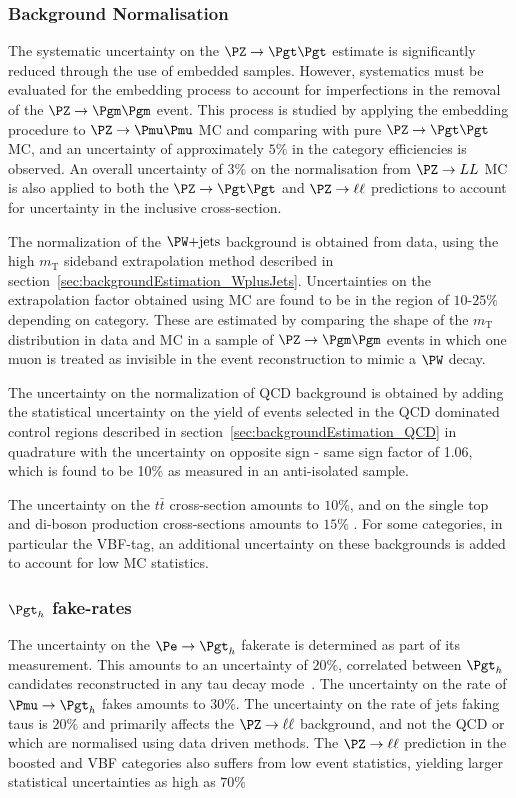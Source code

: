 \subsubsection{\textbf{Background Normalisation}}
The systematic uncertainty on the $\ZToTauTau$ estimate is significantly reduced
through the use of embedded samples. However, systematics must be evaluated for
the embedding process to account for imperfections in the removal of the
$\PZ\to\Pgm\Pgm$ event. This process is studied by applying the embedding
procedure to $\PZ\to\Pmu\Pmu$ \ac{MC} and comparing with pure $\ZToTauTau$
\ac{MC}, and an uncertainty of approximately $5\%$ in the category efficiencies
is observed. An overall uncertainty of $3\%$ on the normalisation from
$\PZ\to LL$ \ac{MC} is also applied to both the $\ZToTauTau$ and
$\PZ\to\ell\ell$ predictions to account for uncertainty in the inclusive
cross-section.

The normalization of the $\WJets$ background is obtained from data, 
using the high $m_{\text{T}}$ sideband extrapolation method described in
section~\ref{sec:backgroundEstimation_WplusJets}. Uncertainties on the
extrapolation factor obtained using \ac{MC} are found to be in the region of
$10$-$25\%$ depending on category. These are estimated by comparing the shape of
the $m_{\text{T}}$ distribution in data and \ac{MC} in a sample of
$\PZ\to\Pgm\Pgm$ events in which one muon is treated as invisible in the event
reconstruction to mimic a $\PW$ decay. 

The uncertainty on the normalization of QCD background is obtained by adding the
statistical uncertainty on the yield of events selected in the QCD dominated control regions
described in section~\ref{sec:backgroundEstimation_QCD} in quadrature with the
uncertainty on opposite sign - same sign factor of 1.06, which is found to be
10$\%$ as measured in an anti-isolated sample.

The uncertainty on the $t \bar{t}$ cross-section amounts to $10\%$, and on the single top and di-boson
production cross-sections amounts to $15\%$
\cite{Chatrchyan:2013oev,Chatrchyan:2012ep}. For some categories, in particular
the VBF-tag, an additional uncertainty on these backgrounds is added to account
for low \ac{MC} statistics.  
 
\subsubsection{\textbf{$\Pgt_{h}$ fake-rates}} 
The uncertainty on the $\Pe \to \Pgt_{h}$ fakerate is determined as part of
its measurement. This amounts to an uncertainty of $20\%$, correlated between
$\Pgt_{h}$ candidates reconstructed in any tau decay mode~\cite{HIG-13-004}. 
The uncertainty on the rate of $\Pmu \to \Pgt_{h}$ fakes amounts to $30\%$.
The uncertainty on the rate of jets faking taus is $20\%$ and primarily affects
the $\PZ\to\ell\ell$ background, and not the QCD or \WJets which are normalised
using data driven methods. The $\PZ\to\ell\ell$ prediction in the boosted and
VBF categories also suffers from low event statistics, yielding larger
statistical uncertainties as high as $70\%$

